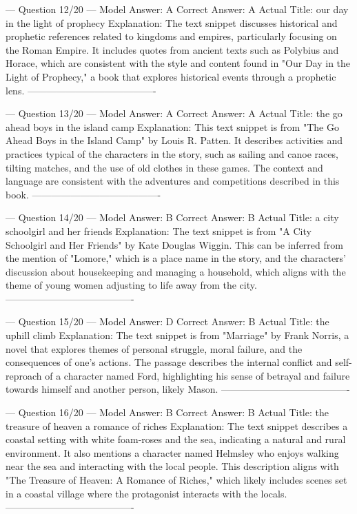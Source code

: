 \documentclass[11pt]{article}
\begin{document}
{--- Question 12/20 ---
Model Answer:    A
Correct Answer:  A
Actual Title:    our day in the light of prophecy
Explanation:     The text snippet discusses historical and prophetic references related to kingdoms and empires, particularly focusing on the Roman Empire. It includes quotes from ancient texts such as Polybius and Horace, which are consistent with the style and content found in "Our Day in the Light of Prophecy," a book that explores historical events through a prophetic lens.
----------------------------------------

--- Question 13/20 ---
Model Answer:    A
Correct Answer:  A
Actual Title:    the go ahead boys in the island camp
Explanation:     This text snippet is from "The Go Ahead Boys in the Island Camp" by Louis R. Patten. It describes activities and practices typical of the characters in the story, such as sailing and canoe races, tilting matches, and the use of old clothes in these games. The context and language are consistent with the adventures and competitions described in this book.
----------------------------------------

--- Question 14/20 ---
Model Answer:    B
Correct Answer:  B
Actual Title:    a city schoolgirl and her friends
Explanation:     The text snippet is from "A City Schoolgirl and Her Friends" by Kate Douglas Wiggin. This can be inferred from the mention of "Lomore," which is a place name in the story, and the characters' discussion about housekeeping and managing a household, which aligns with the theme of young women adjusting to life away from the city.
----------------------------------------

--- Question 15/20 ---
Model Answer:    D
Correct Answer:  B
Actual Title:    the uphill climb
Explanation:     The text snippet is from "Marriage" by Frank Norris, a novel that explores themes of personal struggle, moral failure, and the consequences of one's actions. The passage describes the internal conflict and self-reproach of a character named Ford, highlighting his sense of betrayal and failure towards himself and another person, likely Mason.
----------------------------------------

--- Question 16/20 ---
Model Answer:    B
Correct Answer:  B
Actual Title:    the treasure of heaven a romance of riches
Explanation:     The text snippet describes a coastal setting with white foam-roses and the sea, indicating a natural and rural environment. It also mentions a character named Helmsley who enjoys walking near the sea and interacting with the local people. This description aligns with "The Treasure of Heaven: A Romance of Riches," which likely includes scenes set in a coastal village where the protagonist interacts with the locals.
----------------------------------------

}
\end{document}
